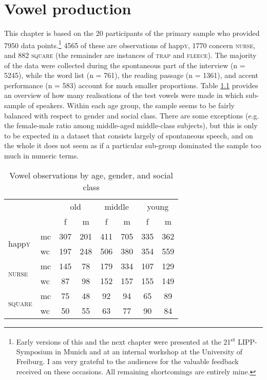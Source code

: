 \chapter{Vowel production}
\label{ch.prod_results_vow}

This chapter is based on the 20 participants of the primary sample who provided 7950 data points.\footnote{Early versions of this and the next chapter were presented at the 21\textsuperscript{st} LIPP-Symposium in Munich and at an internal workshop at the University of Freiburg. I am very grateful to the audiences for the valuable feedback received on these occasions. All remaining shortcomings are entirely mine.}
4565 of these are observations of happ\textsc{y}, 1770 concern \textsc{nurse}, and 882 \textsc{square} (the remainder are instances of \textsc{trap} and \textsc{fleece}).
The majority of the data were collected during the spontaneous part of the interview (n = 5245), while the word list (n = 761), the reading passage (n = 1361), and accent performance (n = 583) account for much smaller proportions.
Table \ref{tab.vowels.n.observations} provides an overview of how many realisations of the test vowels were made in which sub-sample of speakers.
Within each age group, the sample seems to be fairly balanced with respect to gender and social class.
There are some exceptions (e.g. the female-male ratio among middle-aged middle-class subjects), but this is only to be expected in a dataset that consists largely of spontaneous speech, and on the whole it does not seem as if a particular sub-group dominated the sample too much in numeric terms.

\begin{table}[h!]
	\centering
	\caption{Vowel observations by age, gender, and social class}
	\label{tab.vowels.n.observations}
	\begin{tabular}{llcccccc}
		\hline
		\multicolumn{2}{c}{} & \multicolumn{2}{c}{old} & \multicolumn{2}{c}{middle} & \multicolumn{2}{c}{young}\\
		& & f & m & f & m & f & m\\
		\hline
		\multirow{2}{*}{happ\textsc{y}} & mc & 307 & 201 & 411 & 705 & 335 & 362\\
		& wc & 197 & 248 & 506 & 380 & 354 & 559\\
		\multirow{2}{*}{\textsc{nurse}} & mc & 145 & 78 & 179 & 334 & 107 & 129\\
		& wc & 87 & 98 & 152 & 157 & 155 & 149\\
		\multirow{2}{*}{\textsc{square}} & mc & 75 & 48 & 92 & 94 & 65 & 89\\
		& wc & 50 & 55 & 63 & 77 & 90 & 84\\
		\hline
	\end{tabular}
\end{table}

